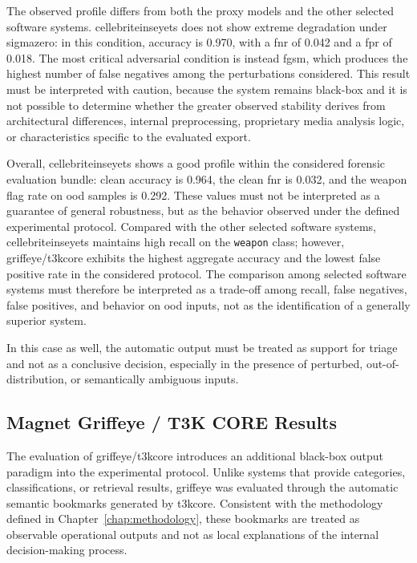 The observed profile differs from both the proxy models and the other selected
software systems. \gls{cellebriteinseyets} does not show extreme degradation
under \gls{sigmazero}: in this condition, accuracy is 0.970, with a \gls{fnr}
of 0.042 and a \gls{fpr} of 0.018. The most critical adversarial condition is
instead \gls{fgsm}, which produces the highest number of false negatives among
the perturbations considered. This result must be interpreted with caution,
because the system remains black-box and it is not possible to determine
whether the greater observed stability derives from architectural differences,
internal preprocessing, proprietary media analysis logic, or characteristics
specific to the evaluated export.

Overall, \gls{cellebriteinseyets} shows a good profile within the considered
forensic evaluation bundle: clean accuracy is 0.964, the clean \gls{fnr} is
0.032, and the weapon flag rate on \gls{ood} samples is 0.292. These values
must not be interpreted as a guarantee of general robustness, but as the
behavior observed under the defined experimental protocol. Compared with the
other selected software systems, \gls{cellebriteinseyets} maintains high recall
on the \texttt{weapon} class; however, \gls{griffeye}/\gls{t3kcore} exhibits
the highest aggregate accuracy and the lowest false positive rate in the
considered protocol. The comparison among selected software systems must
therefore be interpreted as a trade-off among recall, false negatives, false
positives, and behavior on \gls{ood} inputs, not as the identification of a
generally superior system.

In this case as well, the automatic output must be treated as support for
triage and not as a conclusive decision, especially in the presence of
perturbed, out-of-distribution, or semantically ambiguous inputs.

\subsection{Magnet Griffeye / T3K CORE Results}
\label{subsec:results-griffeye}

The evaluation of \gls{griffeye}/\gls{t3kcore} introduces an additional
black-box output paradigm into the experimental protocol. Unlike systems that
provide categories, classifications, or retrieval results, \gls{griffeye} was
evaluated through the automatic semantic bookmarks generated by \gls{t3kcore}.
Consistent with the methodology defined in Chapter~\ref{chap:methodology},
these bookmarks are treated as observable operational outputs and not as local
explanations of the internal decision-making process.

